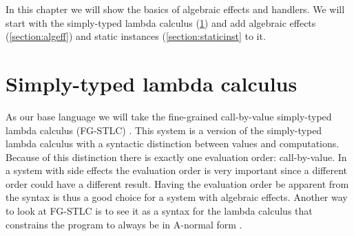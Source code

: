 {
\newcommand\synchange[1]{\colorbox{lightgray}{$#1$}}

\newcommand\eff[0]{\epsilon}
\newcommand\Eff[0]{E}
\newcommand\Op[1]{O^{#1}}

\newcommand\ty[0]{\tau}
\newcommand\tunit[0]{()}
\newcommand\tarr[2]{#1 \rightarrow #2}
\newcommand\thandler[2]{#1 \Rightarrow #2}
\newcommand\tforall[3]{\forall(#1:#2) . #3}
\newcommand\tinst[1]{\mathsf{inst}(#1)}

\newcommand\cty[0]{\underline{\ty}}
\newcommand\aty[2]{#1 \; ! \; #2}
\newcommand\texists[3]{\exists(#1:#2) . #3}
\newcommand\texistss[2]{\exists \overrightarrow{#1} . #2}
\newcommand\val[0]{\nu}
\newcommand\vunit[0]{()}
\newcommand\vinst[0]{\iota}
\newcommand\vabst[3]{\Lambda(#1:#2) . #3}
\newcommand\vabs[2]{\lambda #1 . #2}
\newcommand\vappt[2]{#1 \; [ #2 ]}

\newcommand\comp[0]{c}
\newcommand\creturn[1]{\mathsf{return} \; #1}
\newcommand\capp[2]{#1 \; #2}
\newcommand\cdo[3]{#1 \leftarrow #2 ; #3}
\newcommand\cop[2]{#1(#2)}
\newcommand\copi[3]{#1 \# #2(#3)}
\newcommand\chandle[2]{\mathsf{handle} (#1) \{ #2 \}}
\newcommand\chandlei[3]{\mathsf{handle}^{#1} (#2) \{ #3 \}}
\newcommand\cnew[1]{\mathsf{new} \; #1}
\newcommand\cunpack[4]{(#1, #2) \leftarrow #3 ; #4}

\newcommand\hop[5]{#1 \; #2 \; #3 \rightarrow #4 ; \; #5}
\newcommand\hreturn[2]{\mathsf{return}\; #1 \rightarrow #2}
\newcommand\hopc[4]{#1 \; #2 \; #3 \rightarrow #4}

In this chapter we will show the basics of algebraic effects and handlers. We will start with the simply-typed lambda calculus (\cref{section:stlc}) and add algebraic effects (\cref{section:algeff}) and static instances (\cref{section:staticinst} to it.

\section{Simply-typed lambda calculus} \label{section:stlc}

As our base language we will take the fine-grained call-by-value simply-typed lambda calculus (FG-STLC) \cite{fg-stlc}.
This system is a version of the simply-typed lambda calculus with a syntactic distinction between values and computations.
Because of this distinction there is exactly one evaluation order: call-by-value.
In a system with side effects the evaluation order is very important since a different order could have a different result.
Having the evaluation order be apparent from the syntax is thus a good choice for a system with algebraic effects.
Another way to look at FG-STLC is to see it as a syntax for the lambda calculus that constrains the program to always be in A-normal form \cite{anormalform}.

}
